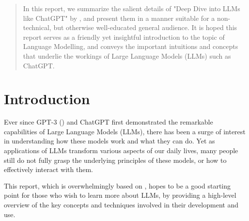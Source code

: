 \documentclass{article} %
\begin{document}
\begin{abstract}
In this report, we summarize the salient details of "Deep Dive into LLMs like ChatGPT" by \cite{Karpathy-2025}, 
and present them in a manner suitable for a non-technical, but otherwise well-educated general audience.
It is hoped this report serves as a friendly yet insightful introduction to the topic of Language Modelling,
and conveys the important intuitions and concepts that underlie the workings of Large Language Models (LLMs) such as ChatGPT.
\end{abstract}

\section{Introduction}
Ever since GPT-3 (\cite{Brown-et-al-2020}) and ChatGPT {\cite{ChatGPT-2022}} 
first demonstrated the remarkable capabilities of Large Language Models (LLMs),
there has been a surge of interest in understanding how these models work and what they can do.
Yet as applications of LLMs transform various aspects of our daily lives,
many people still do not fully grasp the underlying principles of these models,
or how to effectively interact with them.

This report, which is overwhelmingly based on \cite{Karpathy-2025}, hopes to be a good starting point for those who wish to learn more about LLMs,
by providing a high-level overview of the key concepts and techniques involved in their development and use.
\end{document}
